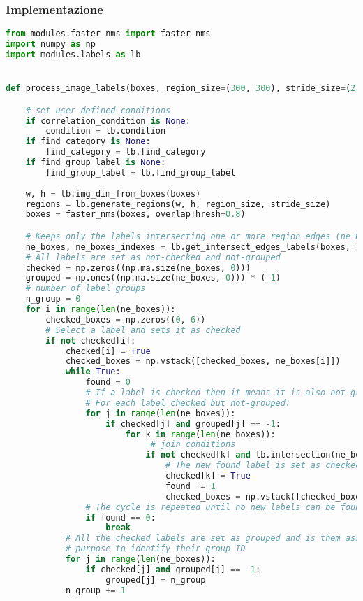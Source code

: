 \subsubsection{Implementazione}
\begin{lstlisting}[language=Python, caption=Python example]
from modules.faster_nms import faster_nms
import numpy as np
import modules.labels as lb


def process_image_labels(boxes, region_size=(300, 300), stride_size=(270, 270), overlap=(0, 0), tol=0, threshold_match=50, correlation_condition=None, find_category=None, find_group_label=None):

    # set user defined conditions
    if correlation_condition is None:
        condition = lb.condition
    if find_category is None:
        find_category = lb.find_category
    if find_group_label is None:
        find_group_label = lb.find_group_label
        
    w, h = lb.img_dim_from_boxes(boxes)
    regions = lb.generate_regions(w, h, region_size, stride_size)
    boxes = faster_nms(boxes, overlapThresh=0.8)

    # Keeps only the labels intersecting one or more region edges (ne_boxes = near edges boxes)
    ne_boxes, ne_boxes_indexes = lb.get_intersect_edges_labels(boxes, regions, tol, overlap)
    # All labels are set as not-checked and not-grouped
    checked = np.zeros((np.ma.size(ne_boxes, 0)))
    grouped = np.ones((np.ma.size(ne_boxes, 0))) * (-1)
    # number of label groups
    n_group = 0
    for i in range(len(ne_boxes)):
        checked_boxes = np.zeros((0, 6))
        # Select a label and sets it as checked
        if not checked[i]:
            checked[i] = True
            checked_boxes = np.vstack([checked_boxes, ne_boxes[i]])
            while True:
                found = 0
                # If a label is checked then it means it is also not-grouped
                # For each label checked but not-grouped:
                for j in range(len(ne_boxes)):
                    if checked[j] and grouped[j] == -1:
                        for k in range(len(ne_boxes)):
                             # join conditions
                            if not checked[k] and lb.intersection(ne_boxes[j, :], ne_boxes[k, :], tol) and condition(ne_boxes[j, :], ne_boxes[k, :]) and lb.intersect_common_edge(ne_boxes[j, :], ne_boxes[k, :], regions, tol, overlap) and lb.matched(ne_boxes[j, :], ne_boxes[k, :], threshold_match) and not lb.belong_same_region_strict_group(ne_boxes[k, :], checked_boxes, regions, tol):
                                # The new found label is set as checked
                                checked[k] = True
                                found += 1
                                checked_boxes = np.vstack([checked_boxes, ne_boxes[k]])
                # The cycle is repeated until no new labels can be found
                if found == 0:
                    break
            # All the checked labels are set as grouped and is them assigned a number with the
            # purpose to identify their group ID
            for j in range(len(ne_boxes)):
                if checked[j] and grouped[j] == -1:
                    grouped[j] = n_group
            n_group += 1


\end{lstlisting}
